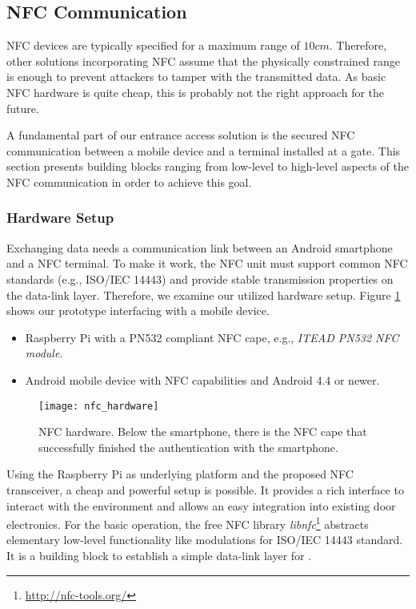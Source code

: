 
\subsection{NFC Communication}\label{sec:comm}
NFC devices are typically specified for a maximum range of $10cm$. Therefore, other solutions incorporating NFC assume that the physically constrained range is enough to prevent attackers to tamper with the transmitted data.
As basic NFC hardware is quite cheap, this is probably not the right approach for the future.

A fundamental part of our \app entrance access solution is the secured NFC communication between a mobile device and a terminal installed at a gate.
This section presents building blocks ranging from low-level to high-level aspects of the NFC communication in order to achieve this goal.


\subsubsection{Hardware Setup}
Exchanging data needs a communication link between an Android smartphone and a NFC terminal.
To make it work, the NFC unit must support common NFC standards (e.g., ISO/IEC 14443) and provide stable transmission properties on the data-link layer.
Therefore, we examine our utilized hardware setup. Figure \ref{fig:nfc:hw} shows our prototype interfacing with a mobile device.
%
\begin{itemize}
	\item Raspberry Pi with a PN532 compliant NFC cape, e.g., \textit{ITEAD PN532 NFC module}.
	\item Android mobile device with NFC capabilities and Android 4.4 or newer.
\end{itemize}
%
\begin{figure}[h]
    \centering
    \texttt{[image: nfc\_hardware]}
    \caption{NFC hardware. Below the smartphone, there is the NFC cape that successfully finished the authentication with the smartphone.}
    \label{fig:nfc:hw}
\end{figure}
%
Using the Raspberry Pi as underlying platform and the proposed NFC transceiver, a cheap and powerful setup is possible.
It provides a rich interface to interact with the environment and allows an easy integration into existing door electronics.
For the basic operation, the free NFC library \textit{libnfc}\footnote{\url{http://nfc-tools.org/}} abstracts elementary low-level functionality like modulations for ISO/IEC 14443 standard.
It is a building block to establish a simple data-link layer for \app.

